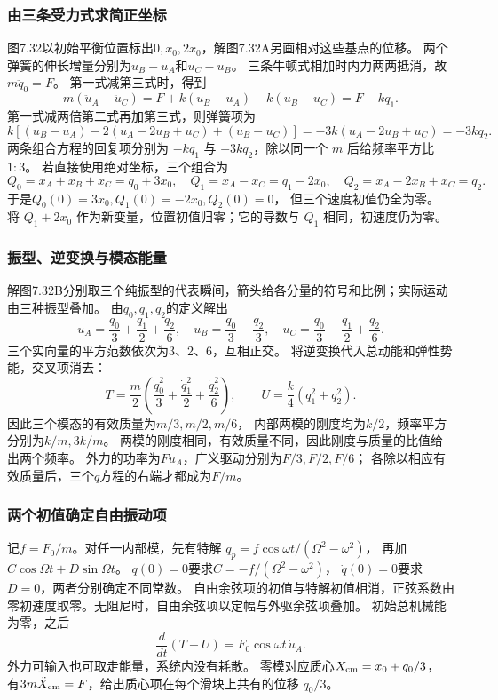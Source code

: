 \documentclass[UTF8,fontset=fandol,a4paper,11pt]{ctexart}
\begin{document}
\subsubsection*{由三条受力式求简正坐标}
图7.32以初始平衡位置标出$0,x_0,2x_0$，解图7.32A另画相对这些基点的位移。
两个弹簧的伸长增量分别为$u_B-u_A$和$u_C-u_B$。
三条牛顿式相加时内力两两抵消，故$m\ddot q_0=F$。
第一式减第三式时，得到
\[
m(\ddot u_A-\ddot u_C)
=F+k(u_B-u_A)-k(u_B-u_C)=F-kq_1.
\]
第一式减两倍第二式再加第三式，则弹簧项为
\[
k[(u_B-u_A)-2(u_A-2u_B+u_C)+(u_B-u_C)]
=-3k(u_A-2u_B+u_C)=-3kq_2.
\]
两条组合方程的回复项分别为 $-kq_1$ 与 $-3kq_2$，除以同一个 $m$ 后给频率平方比 $1:3$。
若直接使用绝对坐标，三个组合为
\[
Q_0=x_A+x_B+x_C=q_0+3x_0,\quad
Q_1=x_A-x_C=q_1-2x_0,\quad
Q_2=x_A-2x_B+x_C=q_2.
\]
于是$Q_0(0)=3x_0,Q_1(0)=-2x_0,Q_2(0)=0$，
但三个速度初值仍全为零。
将 $Q_1+2x_0$ 作为新变量，位置初值归零；它的导数与 $Q_1$ 相同，初速度仍为零。

\subsubsection*{振型、逆变换与模态能量}
解图7.32B分别取三个纯振型的代表瞬间，箭头给各分量的符号和比例；实际运动由三种振型叠加。
由$q_0,q_1,q_2$的定义解出
\[
u_A=\frac{q_0}{3}+\frac{q_1}{2}+\frac{q_2}{6},\quad
u_B=\frac{q_0}{3}-\frac{q_2}{3},\quad
u_C=\frac{q_0}{3}-\frac{q_1}{2}+\frac{q_2}{6}.
\]
三个实向量的平方范数依次为3、2、6，互相正交。
将逆变换代入总动能和弹性势能，交叉项消去：
\[
T=\frac m2\left(\frac{\dot q_0^2}{3}
+\frac{\dot q_1^2}{2}+\frac{\dot q_2^2}{6}\right),\qquad
U=\frac k4(q_1^2+q_2^2).
\]
因此三个模态的有效质量为$m/3,m/2,m/6$，
内部两模的刚度均为$k/2$，频率平方分别为$k/m,3k/m$。
两模的刚度相同，有效质量不同，因此刚度与质量的比值给出两个频率。
外力的功率为$F\dot u_A$，广义驱动分别为$F/3,F/2,F/6$；
各除以相应有效质量后，三个$q$方程的右端才都成为$F/m$。

\subsubsection*{两个初值确定自由振动项}
记$f=F_0/m$。对任一内部模，先有特解
$q_p=f\cos\omega t/(\Omega^2-\omega^2)$，
再加$C\cos\Omega t+D\sin\Omega t$。
$q(0)=0$要求$C=-f/(\Omega^2-\omega^2)$，
$\dot q(0)=0$要求$D=0$，两者分别确定不同常数。
自由余弦项的初值与特解初值相消，正弦系数由零初速度取零。无阻尼时，自由余弦项以定幅与外驱余弦项叠加。
初始总机械能为零，之后
\[
\frac{d}{dt}(T+U)=F_0\cos\omega t\,\dot u_A.
\]
外力可输入也可取走能量，系统内没有耗散。
零模对应质心$X_{\rm cm}=x_0+q_0/3$，
有$3m\ddot X_{\rm cm}=F$，给出质心项在每个滑块上共有的位移 $q_0/3$。
\end{document}
